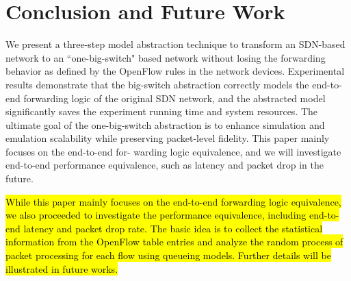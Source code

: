 \section{Conclusion and Future Work}
\label{Sec:conclusion}

We present a three-step model abstraction technique to transform an SDN-based network to
an ``one-big-switch" based network without losing the forwarding behavior as
defined by the OpenFlow rules in the network devices.
Experimental results demonstrate that the big-switch abstraction correctly models
the end-to-end forwarding logic of the original SDN network,
and the abstracted model significantly saves the experiment running time and system resources.
The ultimate goal of the one-big-switch abstraction is to enhance simulation and emulation scalability while preserving packet-level fidelity.
This paper mainly focuses on the end-to-end for- warding logic equivalence, and we will investigate end-to-end performance equivalence, such as latency and packet drop in the future.

\hl{
While this paper mainly focuses on the end-to-end forwarding logic equivalence,
we also proceeded to investigate the performance equivalence,
including end-to-end latency and packet drop rate.
The basic idea is to collect the statistical information from the OpenFlow table entries
and analyze the random process of packet processing for each flow using queueing models.
Further details will be illustrated in future works.
}
\fi
